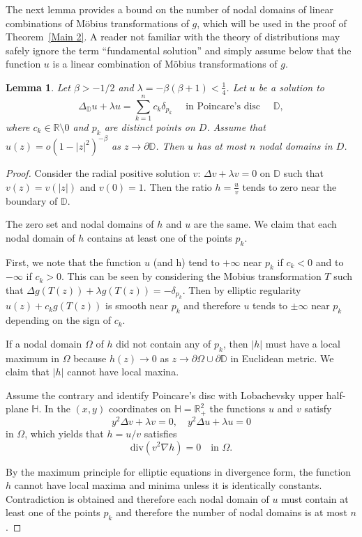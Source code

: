 \documentclass{article}
\newtheorem{lemma}{Lemma}[section]
\begin{document}
The next lemma provides a bound on the number of nodal domains of linear combinations of Möbius transformations of $g$, which will be used in the proof of Theorem~\ref{Main 2}. A reader not familiar with the theory of distributions may safely ignore the term “fundamental solution” and simply assume below that the function $u$ is a linear combination of Möbius transformations of $g$.




\begin{lemma} \label{Lemma:main}
Let $\beta>-1/2$ and $\lambda=-\beta(\beta+1)< \frac{1}{4}$. Let $u$ be a solution to
\[
\Delta_{\mathbb{D}} u + \lambda u=\sum_{k=1}^{n}c_{k}\delta_{p_{k}} \quad \text{ in Poincare's disc } \quad \mathbb{D},
\]
where $c_{k} \in \mathbb{R}\setminus{0}$ and $p_k$ are distinct points on $D$. Assume that $u(z) = o(1-|z|^2)^{-\beta}$ as $z \to \partial \mathbb{D}$. Then $u$ has at most $n$ nodal domains in $D$.
\end{lemma}

\begin{proof}
Consider the radial positive solution $v$: $\Delta v+\lambda v=0$ on $\mathbb{D}$ such that $v(z)= v(|z|)$ and $v(0)=1$. Then the ratio $h=\frac{u}{v}$ tends to zero near the boundary of $\mathbb{D}$. 


 The zero set and nodal domains of $h$ and $u$ are the same.
We claim that each nodal domain of $h$ contains at least one of the points $p_k$.

 First, we note that the function $u$ (and h) tend to $+\infty$ near $p_k$ if $c_k<0$ and to $-\infty$ if $c_k>0$. This can be seen by considering the Mobius transformation $T$ such that $\Delta g(T(z))+\lambda g(T(z))= -\delta_{p_k}$. Then by elliptic regularity $u(z)+c_kg(T(z))$ is smooth near $p_k$ and therefore $u$ tends to $\pm\infty$ near $p_k$ depending on the sign of $c_k$.

If a nodal domain $\Omega$ of $h$ did not contain any of $p_k$, then 
 $|h|$ must have a local maximum in $\Omega$ because $h(z) \to 0$ as $z\to \partial \Omega \cup \partial \mathbb{D}$ in Euclidean metric. We claim that $|h|$ cannot have local maxina.

Assume the contrary and identify Poincare's disc with Lobachevsky upper half-plane $\mathbb{H}$.   In the $(x,y)$ coordinates on $\mathbb{H}=\mathbb{R}_{+}^{2}$ 
the functions $u$ and $v$ satisfy $$y^{2}\Delta v+\lambda v=0, \quad  y^{2}\Delta u+\lambda u=0$$
in $\Omega$, which yields that $h=u/v$ satisfies
\[
\text{div}(v^{2}\nabla h)=0 \quad \text{in } \Omega.
\]

By the maximum principle for elliptic equations in divergence form,
the function $h$ cannot have local maxima and minima unless it is identically constants. Contradiction is obtained and therefore each nodal domain of $u$ must contain at least one of the points $p_k$ and therefore the number of nodal domains is at most $n$.


\end{proof}
\end{document}
